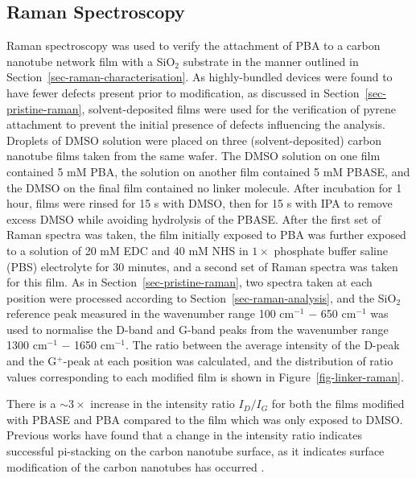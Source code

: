 \documentclass[
  a4paper,
]{scrbook}
\begin{document}
\hypertarget{raman-spectroscopy}{%
\subsection{Raman Spectroscopy}\label{raman-spectroscopy}}

Raman spectroscopy was used to verify the attachment of PBA to a carbon
nanotube network film with a SiO\(_2\) substrate in the manner outlined
in Section~\ref{sec-raman-characterisation}. As highly-bundled devices
were found to have fewer defects present prior to modification, as
discussed in Section~\ref{sec-pristine-raman}, solvent-deposited films
were used for the verification of pyrene attachment to prevent the
initial presence of defects influencing the analysis. Droplets of DMSO
solution were placed on three (solvent-deposited) carbon nanotube films
taken from the same wafer. The DMSO solution on one film contained 5 mM
PBA, the solution on another film contained 5 mM PBASE, and the DMSO on
the final film contained no linker molecule. After incubation for 1
hour, films were rinsed for 15 s with DMSO, then for 15 s with IPA to
remove excess DMSO while avoiding hydrolysis of the PBASE. After the
first set of Raman spectra was taken, the film initially exposed to PBA
was further exposed to a solution of 20 mM EDC and 40 mM NHS in
\(1 \times\) phosphate buffer saline (PBS) electrolyte for 30 minutes,
and a second set of Raman spectra was taken for this film. As in
Section~\ref{sec-pristine-raman}, two spectra taken at each position
were processed according to Section~\ref{sec-raman-analysis}, and the
SiO\(_2\) reference peak measured in the wavenumber range 100
cm\(^{-1}\) \(-\) 650 cm\(^{-1}\) was used to normalise the D-band and
G-band peaks from the wavenumber range 1300 cm\(^{-1}\) \(-\) 1650
cm\(^{-1}\). The ratio between the average intensity of the D-peak and
the G\(^+\)-peak at each position was calculated, and the distribution
of ratio values corresponding to each modified film is shown in
Figure~\ref{fig-linker-raman}.

There is a \(\sim 3 \times\) increase in the intensity ratio \(I_D/I_G\)
for both the films modified with PBASE and PBA compared to the film
which was only exposed to DMSO. Previous works have found that a change
in the intensity ratio indicates successful pi-stacking on the carbon
nanotube surface, as it indicates surface modification of the carbon
nanotubes has occurred \autocite{Wei2010,Lan2013}.
\end{document}
